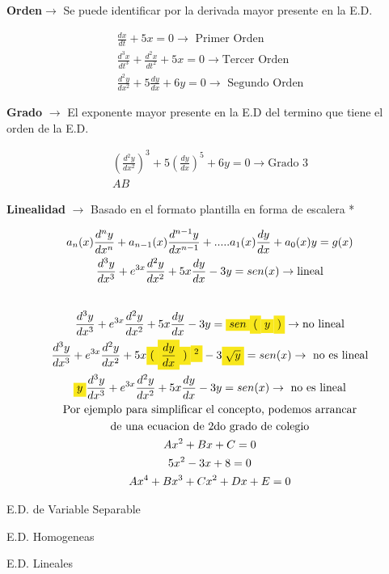 \documentclass{article}
\begin{document}
\textbf{Orden}$\rightarrow$  Se puede identificar por la \colorbox[RGB]{248,231,28}{derivada mayor} presente en la E.D.


\begin{gather*}
\frac{dx}{dt} +5x =0 \rightarrow \text{ Primer Orden} \\
\frac{d^{3}x}{dt^{3}} +\frac{d^{2}x}{dt^{2}}+5x =0  \rightarrow \text{Tercer Orden} \\
\frac{d^{2}y}{dx^{2}}+5\frac{dy}{dx}+6y=0  \rightarrow \text{ Segundo Orden}
\end{gather*}




\textbf{Grado} $\rightarrow$  El exponente mayor presente en la E.D del termino que tiene el orden de la E.D.


\begin{gather*}
(\frac{d^{2}y}{dx^{2}})^{3}+5(\frac{dy}{dx})^{5}+6y=0  \rightarrow \text{Grado 3} \\
       A                  B                      
\end{gather*}




\textbf{Linealidad} $\rightarrow$  Basado en el formato plantilla en forma de escalera *


\begin{gather*}
a_{n}(x)\frac{d^{n}y}{dx^{n}} + a_{n-1}(x)\frac{d^{n-1}y}{dx^{n-1}} + .....a_{1}(x)\frac{dy}{dx}+a_{0}(x)y = g(x) \\
\frac{d^{3}y}{dx^{3}} +e^{3x}\frac{d^{2}y}{dx^{2}}+5x\frac{dy}{dx}-3y =sen(x)  \rightarrow \text{lineal} \\
\vspace{0.5em} \\
\frac{d^{3}y}{dx^{3}} +e^{3x}\frac{d^{2}y}{dx^{2}}+5x\frac{dy}{dx}-3y =\text{\colorbox[RGB]{248,231,28}{$sen$}}\text{\colorbox[RGB]{248,231,28}{$($}}\text{\colorbox[RGB]{248,231,28}{$y$}}\text{\colorbox[RGB]{248,231,28}{$)$}}  \rightarrow \text{no lineal} \\
\frac{d^{3}y}{dx^{3}} +e^{3x}\frac{d^{2}y}{dx^{2}}+5x\text{\colorbox[RGB]{248,231,28}{$($}}\text{\colorbox[RGB]{248,231,28}{$\frac{dy}{dx}$}}\text{\colorbox[RGB]{248,231,28}{$)$}}\text{\colorbox[RGB]{248,231,28}{$^{2}$}}-3\text{\colorbox[RGB]{248,231,28}{$\sqrt{y}$}} =sen(x)  \rightarrow \text{ no es lineal} \\
\text{\colorbox[RGB]{248,231,28}{$y$}}\frac{d^{3}y}{dx^{3}} +e^{3x}\frac{d^{2}y}{dx^{2}}+5x\frac{dy}{dx}-3y =sen(x) \rightarrow \text{ no es lineal} \\
\text{Por ejemplo para simplificar el concepto, podemos arrancar} \\
\text{de una ecuacion de 2do grado de colegio} \\
Ax^{2}+Bx+C=0 \\
5x^{2}-3x+8=0 \\
Ax^{4}+Bx^{3}+Cx^{2}+Dx+E=0
\end{gather*}


E.D. de Variable Separable

E.D. Homogeneas

E.D. Lineales
\end{document}

